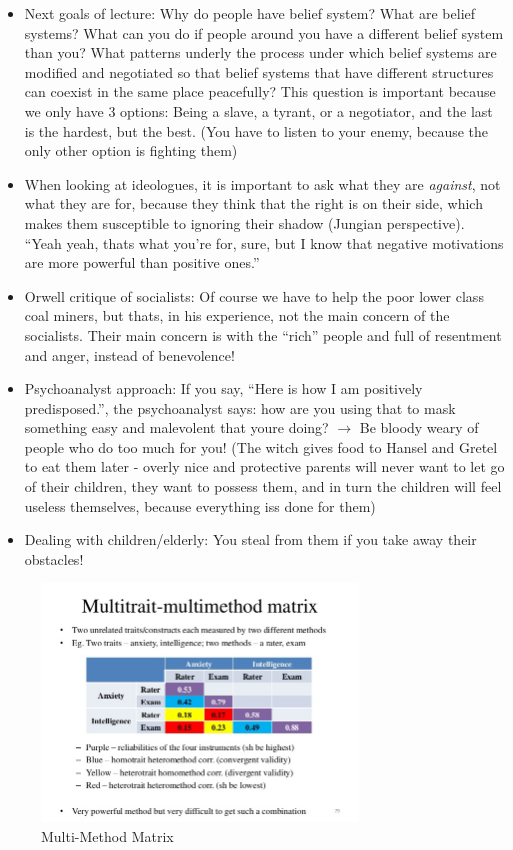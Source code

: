 \documentclass[emulatestandardclasses]{scrartcl}
\begin{document}
\begin{itemize}
  \item Next goals of lecture: Why do people have belief system? What are belief systems? What can you do if people around you have a different belief system than you? What patterns underly the process under which belief systems are modified and negotiated so that belief systems that have different structures can coexist in the same place peacefully? This question is important because we only have 3 options: Being a slave, a tyrant, or a negotiator, and the last is the hardest, but the best. (You have to listen to your enemy, because the only other option is fighting them)
  \item When looking at ideologues, it is important to ask what they are \emph{against}, not what they are for, because they think that the right is on their side, which makes them susceptible to ignoring their shadow (Jungian perspective). "`Yeah yeah, thats what you're for, sure, but I know that negative motivations are more powerful than positive ones."'
  \item Orwell critique of socialists: Of course we have to help the poor lower class coal miners, but thats, in his experience, not the main concern of the socialists. Their main concern is with the "`rich"' people and full of resentment and anger, instead of benevolence!
  \item Psychoanalyst approach: If you say, "`Here is how I am positively predisposed."', the psychoanalyst says: how are you using that to mask something easy and malevolent that youre doing? $\rightarrow$ Be bloody weary of people who do too much for you! (The witch gives food to Hansel and Gretel to eat them later - overly nice and protective parents will never want to let go of their children, they want to possess them, and in turn the children will feel useless themselves, because everything iss done for them)
  \item Dealing with children/elderly: You steal from them if you take away their obstacles!
 \end{itemize}

\begin{figure}[h]
	\centering
	\includegraphics[width=0.75\textwidth]{images/mmm}
	\caption{Multi-Method Matrix}
	\label{fig:mmm}
\end{figure}
\end{document}
